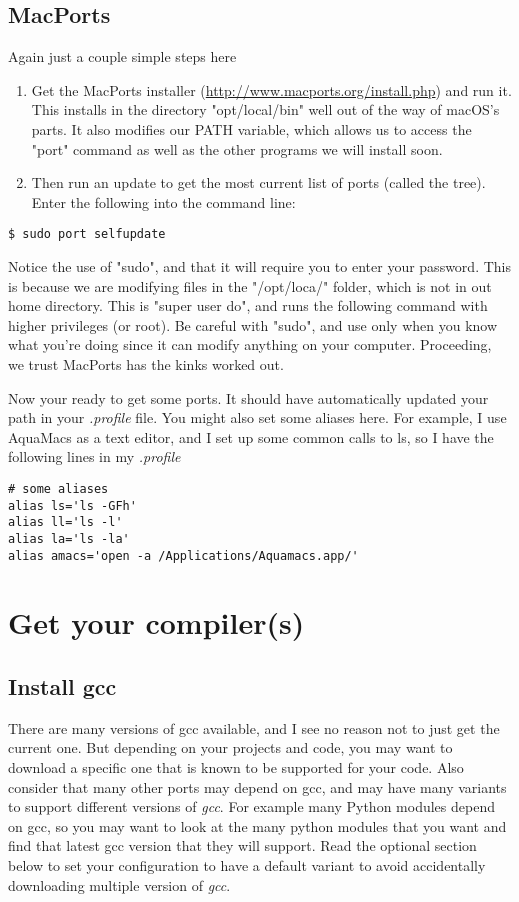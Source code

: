 \documentclass[11pt]{article}
\begin{document}
\subsection{MacPorts}
Again just a couple simple steps here
\begin{enumerate}
	\item Get the MacPorts installer (\url{http://www.macports.org/install.php}) and run it. This installs in the directory "opt/local/bin" well out of the way of macOS's parts. It also modifies our PATH variable, which allows us to access the "port" command as well as the other programs we will install soon.
	\item Then run an update to get the most current list of ports (called the tree). Enter the following into the command line:
\end{enumerate}
\begin{lstlisting}[style=Bash]
$ sudo port selfupdate
\end{lstlisting}
Notice the use of "sudo", and that it will require you to enter your password. This is because we are modifying files in the "/opt/loca/" folder, which is not in out home directory. This is "super user do", and runs the following command with higher privileges (or root). Be careful with "sudo", and use only when you know what you're doing since it can modify anything on your computer. Proceeding, we trust MacPorts has the kinks worked out.

Now your ready to get some ports. It should have automatically updated your path in your \textit{.profile} file. You might also set some aliases here.  For example, I use AquaMacs as a text editor, and I set up some common calls to ls, so I have the following lines in my \textit{.profile} 
\begin{lstlisting}[backgroundcolor=\color{light-gray},basicstyle=\ttfamily,xleftmargin=.25in,xrightmargin=.25in]
# some aliases
alias ls='ls -GFh'
alias ll='ls -l'
alias la='ls -la'                         
alias amacs='open -a /Applications/Aquamacs.app/'
\end{lstlisting}



%
%
\section{Get your compiler(s)}
\subsection{Install gcc}
There are many versions of gcc available, and I see no reason not to just get the current one. But depending on your projects and code, you may want to download a specific one that is known to be supported for your code. Also consider that many other ports may depend on gcc, and may have many variants to support different versions of \textit{gcc}. For example many Python modules depend on gcc, so you may want to look at the many python modules that you want and find that latest gcc version that they will support. Read the optional section below to set your configuration to have a default variant to avoid accidentally downloading multiple version of \textit{gcc}. 
\end{document}

